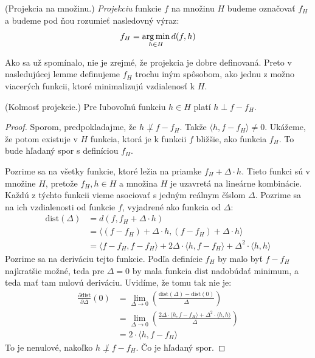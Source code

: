 \begin{definition}
  (Projekcia na množinu.) \emph{Projekciu} funkcie $f$ na množinu $H$
  budeme označovať $f_H$ a budeme pod ňou rozumieť nasledovný výraz:
  $$f_H = \operatorname*{arg\,min}_{h \in H} d(f, h)$$
\end{definition}

\begin{remark}
  Ako sa už spomínalo, nie je zrejmé, že projekcia je dobre definovaná.
  Preto v nasledujúcej lemme definujeme $f_H$ trochu iným spôsobom, ako
  jednu z možno viacerých funkcii, ktoré minimalizujú vzdialenosť k $H$.
\end{remark}

\begin{lemma}
  (Kolmosť projekcie.) Pre ľubovoľnú funkciu $h \in H$ platí $h \perp f - f_H$.
\end{lemma}
\begin{proof}
  Sporom, predpokladajme, že $h \not\perp f - f_H$. Takže
  $\langle h, f - f_H \rangle \neq 0$. Ukážeme, že potom existuje
  v $H$ funkcia, ktorá je k funkcii $f$ bližšie, ako funkcia $f_H$.
  To bude hľadaný spor s definíciou $f_H$.
  
  Pozrime sa na všetky funkcie, ktoré ležia na priamke
  $f_H + \Delta \cdot h$. Tieto funkci sú v množine $H$, pretože
  $f_H, h \in H$ a množina $H$ je uzavretá na lineárne kombinácie.
  Každú z týchto funkcii vieme asociovať s jedným reálnym číslom
  $\Delta$. Pozrime sa na ich vzdialenosti od funkcie $f$, vyjadrené
  ako funkcia od $\Delta$:
  \begin{align}
    \text{dist}(\Delta)
      &= d(f, f_H + \Delta \cdot h) \\
      &= \langle (f - f_H) + \Delta \cdot h, (f - f_H) + \Delta \cdot h \rangle \\
      &= \langle f - f_H, f - f_H \rangle + 2\Delta \cdot \langle h, f - f_H \rangle + \Delta^2 \cdot \langle h, h \rangle
  \end{align}
  Pozrime sa na deriváciu tejto funkcie. Podľa definície $f_H$ by
  malo byť $f - f_H$ najkratšie možné, teda pre $\Delta = 0$ by mala
  funkcia $\text{dist}$ nadobúdať minimum, a teda mať tam nulovú
  deriváciu. Uvidíme, že tomu tak nie je:
  \begin{align}
    \frac{\partial \text{dist}}{\partial \Delta} \left( 0 \right)
      &= \lim_{\Delta \to 0} \left( \frac{\text{dist}(\Delta) - \text{dist}(0)}{\Delta} \right) \\
      &= \lim_{\Delta \to 0} \left( \frac{2\Delta \cdot \langle h, f - f_H \rangle + \Delta^2 \cdot \langle h, h \rangle}{\Delta} \right) \\
      &= 2 \cdot \langle h, f - f_H \rangle
  \end{align}
  To je nenulové, nakoľko $h \not \perp f - f_H$. Čo je hľadaný spor.
\end{proof}

